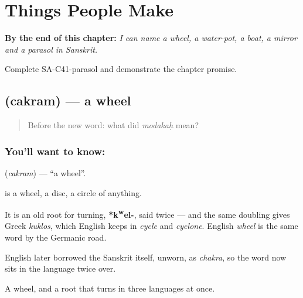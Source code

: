 
\chapter{Things People Make}
\label{ch:sa-things-people-make}

\begin{chapteropening}
\textbf{By the end of this chapter:} \emph{I can name a wheel, a water-pot, a boat, a mirror and a parasol in Sanskrit.}

Complete SA-C41-parasol and demonstrate the chapter promise.
\end{chapteropening}

\section[\texorpdfstring{\sk{चक्रम्} (cakram)}{चक्रम् (cakram)}]{ (cakram) — a wheel}

\label{lesson:SA-C41-wheel}



\begin{quote}
Before the new word: what did \emph{modakaḥ} mean?
\end{quote}

\subsection*{You'll want to know: }
\textbf{} (\emph{cakram}) — \textquotedblleft{}a wheel\textquotedblright{}.

\textbf{} is a wheel, a disc, a circle of anything.

It is an old root for turning, \textbf{*k\textsuperscript{w}el-}, said twice — and the same doubling gives Greek \emph{kuklos}, which English keeps in \emph{cycle} and \emph{cyclone}. English \emph{wheel} is the same word by the Germanic road.

English later borrowed the Sanskrit itself, unworn, as \emph{chakra}, so the word now sits in the language twice over.

\begin{grammarlens}[title={What you've built}]
A wheel, and a root that turns in three languages at once.
\end{grammarlens}


